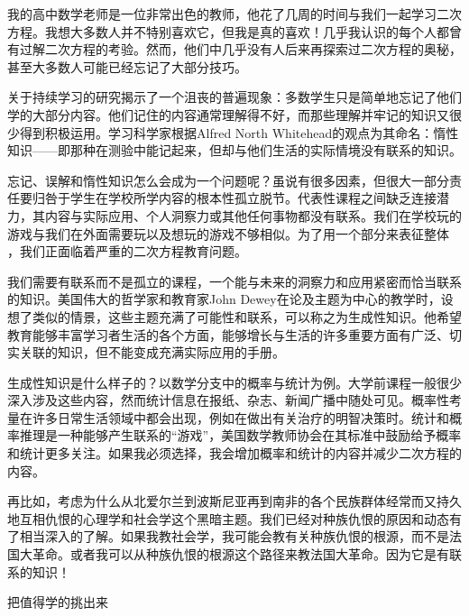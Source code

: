 我的高中数学老师是一位非常出色的教师，他花了几周的时间与我们一起学习二次方程。我想大多数人并不特别喜欢它，但我是真的喜欢！几乎我认识的每个人都曾有过解二次方程的考验。然而，他们中几乎没有人后来再探索过二次方程的奥秘，甚至大多数人可能已经忘记了大部分技巧。

关于持续学习的研究揭示了一个沮丧的普遍现象：多数学生只是简单地忘记了他们学的大部分内容。他们记住的内容通常理解得不好，而那些理解并牢记的知识又很少得到积极运用。学习科学家根据Alfred North Whitehead的观点为其命名：惰性知识——即那种在测验中能记起来，但却与他们生活的实际情境没有联系的知识。

忘记、误解和惰性知识怎么会成为一个问题呢？虽说有很多因素，但很大一部分责任要归咎于学生在学校所学内容的根本性孤立脱节。代表性课程之间缺乏连接潜力，其内容与实际应用、个人洞察力或其他任何事物都没有联系。我们在学校玩的游戏与我们在外面需要玩以及想玩的游戏不够相似。为了用一个部分来表征整体 ，我们正面临着严重的二次方程教育问题。

我们需要有联系而不是孤立的课程，一个能与未来的洞察力和应用紧密而恰当联系的知识。美国伟大的哲学家和教育家John Dewey在论及主题为中心的教学时，设想了类似的情景，这些主题充满了可能性和联系，可以称之为生成性知识。他希望教育能够丰富学习者生活的各个方面，能够增长与生活的许多重要方面有广泛、切实关联的知识，但不能变成充满实际应用的手册。

生成性知识是什么样子的？以数学分支中的概率与统计为例。大学前课程一般很少深入涉及这些内容，然而统计信息在报纸、杂志、新闻广播中随处可见。概率性考量在许多日常生活领域中都会出现，例如在做出有关治疗的明智决策时。统计和概率推理是一种能够产生联系的“游戏”，美国数学教师协会在其标准中鼓励给予概率和统计更多关注。如果我必须选择，我会增加概率和统计的内容并减少二次方程的内容。

再比如，考虑为什么从北爱尔兰到波斯尼亚再到南非的各个民族群体经常而又持久地互相仇恨的心理学和社会学这个黑暗主题。我们已经对种族仇恨的原因和动态有了相当深入的了解。如果我教社会学，我可能会教有关种族仇恨的根源，而不是法国大革命。或者我可以从种族仇恨的根源这个路径来教法国大革命。因为它是有联系的知识！

把值得学的挑出来

